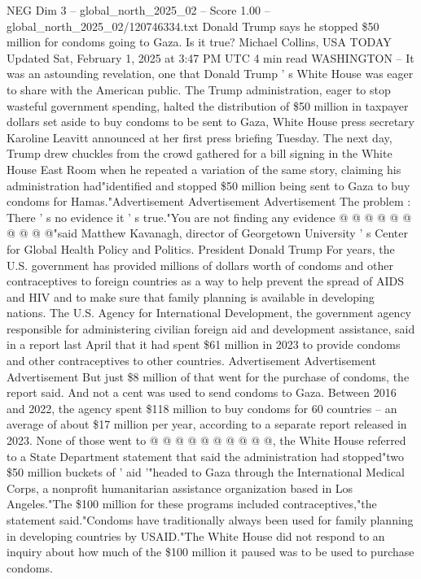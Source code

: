 \begin{textsample}{NEG Dim 3 – global\_north\_2025\_02 – Score 1.00 – global\_north\_2025\_02/120746334.txt}  \label{ex:f3_neg_173}
Donald Trump says he stopped \$50 million for condoms going to Gaza.
Is it true?
Michael Collins, USA TODAY Updated Sat, February 1, 2025 at 3:47 PM UTC 4 min read WASHINGTON -- It was an astounding revelation, one that Donald Trump ' s White House was eager to share with the American public.
The Trump administration, eager to stop wasteful government spending, halted the distribution of \$50 million in taxpayer dollars set aside to buy condoms to be sent to Gaza, White House press secretary Karoline Leavitt announced at her first press briefing Tuesday.
The next day, Trump drew chuckles from the crowd gathered for a bill signing in the White House East Room when he repeated a variation of the same story, claiming his administration had"identified and stopped \$50 million being sent to Gaza to buy condoms for Hamas."Advertisement Advertisement Advertisement The problem : There ' s no evidence it ' s true."You are not finding any evidence @ @ @ @ @ @ @ @ @ @"said Matthew Kavanagh, director of Georgetown University ' s Center for Global Health Policy and Politics.
President Donald Trump For years, the U.S. government has provided millions of dollars worth of condoms and other contraceptives to foreign countries as a way to help prevent the spread of AIDS and HIV and to make sure that family planning is available in developing nations.
The U.S.
Agency for International Development, the government agency responsible for administering civilian foreign aid and development assistance, said in a report last April that it had spent \$61 million in 2023 to provide condoms and other contraceptives to other countries.
Advertisement Advertisement Advertisement But just \$8 million of that went for the purchase of condoms, the report said.
And not a cent was used to send condoms to Gaza.
Between 2016 and 2022, the agency spent \$118 million to buy condoms for 60 countries -- an average of about \$17 million per year, according to a separate report released in 2023.
None of those went to @ @ @ @ @ @ @ @ @ @, the White House referred to a State Department statement that said the administration had stopped"two \$50 million buckets of ' aid '"headed to Gaza through the International Medical Corps, a nonprofit humanitarian assistance organization based in Los Angeles."The \$100 million for these programs included contraceptives,"the statement said."Condoms have traditionally always been used for family planning in developing countries by USAID."The White House did not respond to an inquiry about how much of the \$100 million it paused was to be used to purchase condoms.

\end{textsample}

